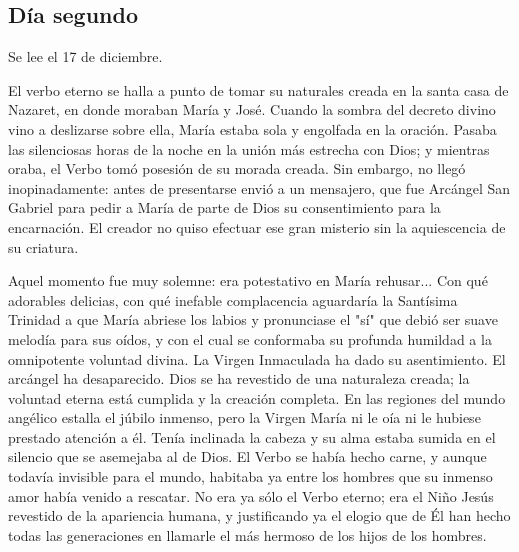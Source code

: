 \documentclass[spanish,utf8,twocolumn]{chlart}
\newenvironment{summary}{\begingroup
	\small\sffamily\itshape%
	\setlength{\leftskip}{3em}\setlength{\rightskip}{3em}\noindent
	}{\par\endgroup}
\newenvironment{lectura}{\begingroup\color{lector}}{\endgroup\par}
\begin{document}
\subsection*{Día segundo}
\begin{summary}
Se lee el 17 de diciembre.
\end{summary}
\begin{lectura}
El verbo eterno se halla a punto de tomar su naturales creada en la
santa casa de Nazaret, en donde moraban María y José.
Cuando la sombra del decreto divino vino a deslizarse sobre ella, María
estaba sola y engolfada en la oración.
Pasaba las silenciosas horas de la noche en la unión más estrecha con
Dios; y mientras oraba, el Verbo tomó posesión de su morada creada.
Sin embargo, no llegó inopinadamente:
antes de presentarse envió a un mensajero, que fue Arcángel San Gabriel
para pedir a María de parte de Dios su consentimiento para la encarnación.
El creador no quiso efectuar ese gran misterio sin la aquiescencia de su
criatura.

Aquel momento fue muy solemne:
era potestativo en María rehusar...
Con qué adorables delicias, con qué inefable complacencia aguardaría la
Santísima Trinidad a que María abriese los labios y pronunciase el "sí"
que debió ser suave melodía para sus oídos, y con el cual se conformaba
su profunda humildad a la omnipotente voluntad divina.
La Virgen Inmaculada ha dado su asentimiento.
El arcángel ha desaparecido.
Dios se ha revestido de una naturaleza creada; la voluntad eterna está
cumplida y la creación completa.
En las regiones del mundo angélico estalla el júbilo inmenso, pero la
Virgen María ni le oía ni le hubiese prestado atención a él.
Tenía inclinada la cabeza y su alma estaba sumida en el silencio que se
asemejaba al de Dios.
El Verbo se había hecho carne, y aunque todavía invisible para el mundo,
habitaba ya entre los hombres que su inmenso amor había venido a
rescatar.
No era ya sólo el Verbo eterno; era el Niño Jesús revestido de la
apariencia humana, y justificando ya el elogio que de Él han hecho todas
las generaciones en llamarle el más hermoso de los hijos de los hombres.
\end{lectura}
\end{document}
